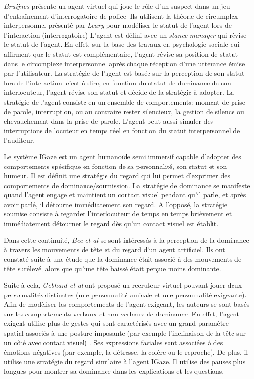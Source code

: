		\emph{Bruijnes} \cite{bruijnes2013affective} présente un agent virtuel qui joue le rôle d'un suspect dans un jeu d'entraînement 
		d'interrogatoire de police.
		 Ils utilisent la théorie de circumplex interpersonnel présenté par \emph{Leary} \cite{leary2004interpersonal} pour modéliser le statut de l'agent lors de l'interaction (interrogatoire)
		L'agent est défini avec un \textit{stance manager} qui révise le statut de l'agent. En effet, sur la base des travaux en psychologie sociale qui affirment que le statut est complémentaire, l'agent révise sa position de statut dans le circomplexe interpersonnel après chaque réception d'une utterance émise par l'utilisateur. La stratégie de l'agent est basée sur la perception de son statut lors de l'interaction, c'est à dire, en fonction du statut de dominance de son interlocuteur, l'agent révise son statut et décide de la stratégie à adopter. La stratégie de l'agent consiste en un ensemble de comportements: moment de prise de parole, interruption, ou au contraire rester silencieux, la gestion de silence ou chevauchement dans la prise de parole. L'agent peut aussi simuler des interruptions de locuteur en temps réel en fonction du statut interpersonnel de l'auditeur.
		
		Le système	IGaze  \cite{kipp2008igaze} est un agent humanoïde semi immersif capable d'adopter des comportements spécifique en fonction de sa personnalité, son statut et son humeur. Il est définit une stratégie du regard qui lui permet d'exprimer des comportements de dominance/soumission. La stratégie de dominance se manifeste quand l'agent engage et maintient un contact visuel pendant qu'il parle, et après avoir parlé, il détourne immédiatement son regard. A l'opposé, la stratégie soumise consiste à regarder l'interlocuteur de temps en temps brièvement et immédiatement détourner le regard dès qu'un contact visuel est établit. 
		
		Dans cette continuité, \emph{Bee et al} \cite{bee2009relations} se sont intéressés à la perception de la dominance à travers les mouvements de tête et du regard d'un agent artificiel. Ils ont constaté suite à une étude que la dominance était associé à des mouvements de tête surélevé, alors que qu'une tête baissé était perçue moins dominante.
		
		Suite à cela, \emph{Gebhard et al} \cite{gebhard2014exploring} ont proposé un recruteur virtuel pouvant jouer deux personnalités distinctes (une personnalité amicale et une personnalité exigeante). Afin de modéliser les comportements de l'agent exigeant, les auteurs se sont basés sur les comportements verbaux et non verbaux de dominance. En effet, l'agent exigent utilise plus de gestes qui sont caractérisés avec un grand paramètre spatial associés à une posture imposante (par exemple l'inclinaison de la tête sur un côté avec  contact visuel) \cite{gebhard2014exploring}. Ses expressions faciales sont associées à des émotions négatives (par exemple, la détresse, la colère ou le reproche). De plus, il utilise une stratégie du regard similaire à l'agent IGaze.
		Il utilise des pauses plus longues pour montrer sa dominance dans les explications et les questions. 
		
